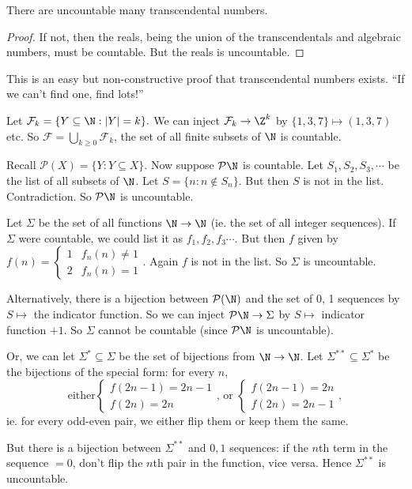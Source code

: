 \documentclass[a4paper]{article}
\begin{document}
  \begin{cor}
    There are uncountable many transcendental numbers.
  \end{cor}

  \begin{proof}
    If not, then the reals, being the union of the transcendentals and algebraic numbers, must be countable. But the reals is uncountable.
  \end{proof}
  \note This is an easy but non-constructive proof that transcendental numbers exists. ``If we can't find one, find lots!''

  \begin{eg}
    Let $\mathcal{F}_k = \{Y\subseteq \N: |Y| = k\}.$ We can inject $\mathcal{F}_k \to \Z^k$ by $\{1, 3, 7\}\mapsto (1, 3, 7)$ etc. So $\mathcal{F} = \bigcup_{k\geq 0}\mathcal{F}_k$, the set of all finite subsets of $\N$ is countable.
  \end{eg}

  \begin{eg}
    Recall $\mathcal{P}(X) = \{Y: Y\subseteq X\}$. Now suppose $\mathcal{P}\N$ is countable. Let $S_1,S_2,S_3, \cdots$ be the list of all subsets of $\N$. Let $S = \{n: n\not\in S_n\}$. But then $S$ is not in the list. Contradiction. So $\mathcal{P}\N$ is uncountable.
  \end{eg}

  \begin{eg}
    Let $\Sigma$ be the set of all functions $\N\to \N$ (ie. the set of all integer sequences). If $\Sigma$ were countable, we could list it as $f_1, f_2, f_3\cdots$. But then $f$ given by $f(n) = 
    \begin{cases}
      1 & f_n(n) \not= 1\\
      2 & f_n(n) = 1
    \end{cases}$. Again $f$ is not in the list. So $\Sigma$ is uncountable.

    Alternatively, there is a bijection between $\mathcal{P}(\N)$ and the set of 0, 1 sequences by $S\mapsto$ the indicator function. So we can inject $\mathcal{P}\N \to \Sigma$ by $S\mapsto $ indicator function $+1$. So $\Sigma$ cannot be countable (since $\mathcal{P}\N$ is uncountable).

    Or, we can let $\Sigma^*\subseteq \Sigma$ be the set of bijections from $\N\to\N$. Let $\Sigma^{**}\subseteq \Sigma^*$ be the bijections of the special form: for every $n$,
    \[
      \text{either}
      \begin{cases}
        f(2n - 1) = 2n - 1\\
        f(2n) = 2n
      \end{cases}\text{, or }
      \begin{cases}
        f(2n - 1) = 2n\\
        f(2n) = 2n - 1
      \end{cases},
    \]
    ie. for every odd-even pair, we either flip them or keep them the same.

    But there is a bijection between $\Sigma^{**}$ and $0,1$ sequences: if the $n$th term in the sequence $ = 0$, don't flip the $n$th pair in the function, vice versa. Hence $\Sigma^{**}$ is uncountable. 
  \end{eg}
\end{document}
